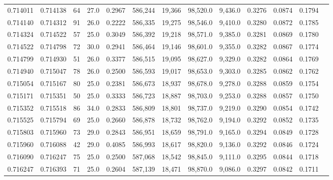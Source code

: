 \begin{tabular}{rrrrrrrrrrrrr}
0.714011 & 0.714138 &    64 & 27.0 &                                     0.2967 & 586,244 &  19,366 &  98,520.0 &   9,436.0 & 0.3276 & 0.0874 & 0.1794 \\
0.714140 & 0.714312 &    91 & 26.0 &                                     0.2222 & 586,335 &  19,275 &  98,546.0 &   9,410.0 & 0.3280 & 0.0872 & 0.1785 \\
0.714324 & 0.714522 &    57 & 25.0 &                                     0.3049 & 586,392 &  19,218 &  98,571.0 &   9,385.0 & 0.3281 & 0.0869 & 0.1780 \\
0.714522 & 0.714798 &    72 & 30.0 &                                     0.2941 & 586,464 &  19,146 &  98,601.0 &   9,355.0 & 0.3282 & 0.0867 & 0.1774 \\
0.714799 & 0.714930 &    51 & 26.0 &                                     0.3377 & 586,515 &  19,095 &  98,627.0 &   9,329.0 & 0.3282 & 0.0864 & 0.1769 \\
0.714940 & 0.715047 &    78 & 26.0 &                                     0.2500 & 586,593 &  19,017 &  98,653.0 &   9,303.0 & 0.3285 & 0.0862 & 0.1762 \\
0.715054 & 0.715167 &    80 & 25.0 &                                     0.2381 & 586,673 &  18,937 &  98,678.0 &   9,278.0 & 0.3288 & 0.0859 & 0.1754 \\
0.715171 & 0.715351 &    50 & 25.0 &                                     0.3333 & 586,723 &  18,887 &  98,703.0 &   9,253.0 & 0.3288 & 0.0857 & 0.1750 \\
0.715352 & 0.715518 &    86 & 34.0 &                                     0.2833 & 586,809 &  18,801 &  98,737.0 &   9,219.0 & 0.3290 & 0.0854 & 0.1742 \\
0.715525 & 0.715794 &    69 & 25.0 &                                     0.2660 & 586,878 &  18,732 &  98,762.0 &   9,194.0 & 0.3292 & 0.0852 & 0.1735 \\
0.715803 & 0.715960 &    73 & 29.0 &                                     0.2843 & 586,951 &  18,659 &  98,791.0 &   9,165.0 & 0.3294 & 0.0849 & 0.1728 \\
0.715960 & 0.716088 &    42 & 29.0 &                                     0.4085 & 586,993 &  18,617 &  98,820.0 &   9,136.0 & 0.3292 & 0.0846 & 0.1724 \\
0.716090 & 0.716247 &    75 & 25.0 &                                     0.2500 & 587,068 &  18,542 &  98,845.0 &   9,111.0 & 0.3295 & 0.0844 & 0.1718 \\
0.716247 & 0.716393 &    71 & 25.0 &                                     0.2604 & 587,139 &  18,471 &  98,870.0 &   9,086.0 & 0.3297 & 0.0842 & 0.1711 \\

\end{tabular}

